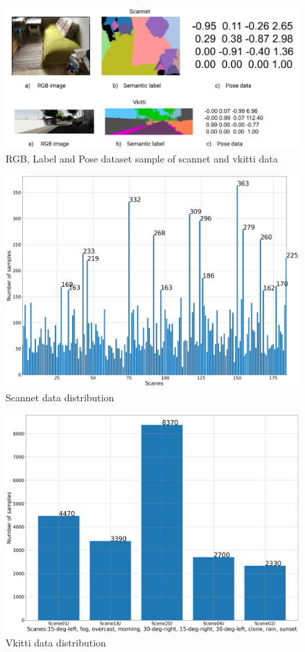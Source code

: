 	\begin{figure}[h]
		\centering
		\includegraphics[width=14cm]{images/scannet_vkitti_data.png}
		\caption{RGB, Label and Pose dataset sample of scannet and vkitti data}
		\label{fig:scannet_vkitti}
	\end{figure}	

	\begin{figure}[h]
		\centering
		\includegraphics[width=14cm]{images/scannet_scanes_samples.png}
		\caption{Scannet data distribution}
		\label{fig:scannet_vkitti}
	\end{figure}

	\begin{figure}[h]
		\centering
		\includegraphics[width=14cm]{images/vkitti_scanes_samples.png}
		\caption{Vkitti data distribution}
		\label{fig:scannet_vkitti}
	\end{figure}	
	
